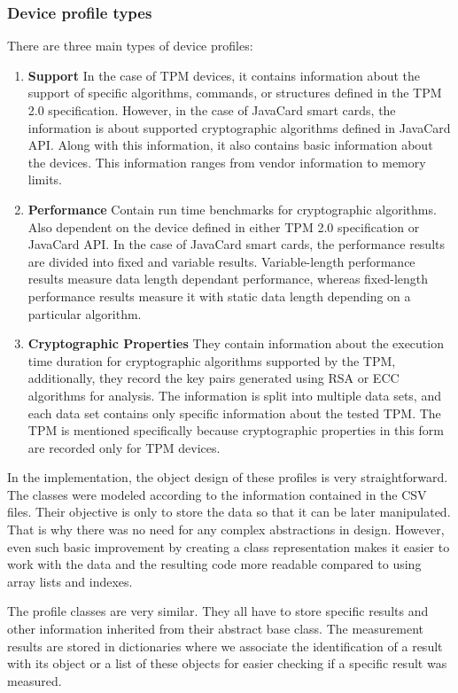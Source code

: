 \subsubsection{Device profile types}
There are three main types of device profiles:
\begin{enumerate}
    \item \textbf{Support} In the case of TPM devices, it contains information about the support of specific algorithms, commands, or structures defined in the TPM 2.0 specification. However, in the case of JavaCard smart cards, the information is about supported cryptographic algorithms defined in JavaCard API. Along with this information, it also contains basic information about the devices. This information ranges from vendor information to memory limits.
    
    \item \textbf{Performance} Contain run time benchmarks for cryptographic algorithms. Also dependent on the device defined in either TPM 2.0 specification or JavaCard API. In the case of JavaCard smart cards, the performance results are divided into fixed and variable results. Variable-length performance results measure data length dependant performance, whereas fixed-length performance results measure it with static data length depending on a particular algorithm.
    
    \item \textbf{Cryptographic Properties} They contain information about the execution time duration for cryptographic algorithms supported by the TPM, additionally, they record the key pairs generated using RSA or ECC algorithms for analysis. The information is split into multiple data sets, and each data set contains only specific information about the tested TPM. The TPM is mentioned specifically because cryptographic properties in this form are recorded only for TPM devices.
\end{enumerate}

In the implementation, the object design of these profiles is very straightforward. The classes were modeled according to the information contained in the CSV files. Their objective is only to store the data so that it can be later manipulated. That is why there was no need for any complex abstractions in design. However, even such basic improvement by creating a class representation makes it easier to work with the data and the resulting code more readable compared to using array lists and indexes.

The profile classes are very similar. They all have to store specific results and other information inherited from their abstract base class. The measurement results are stored in dictionaries where we associate the identification of a result with its object or a list of these objects for easier checking if a specific result was measured.

